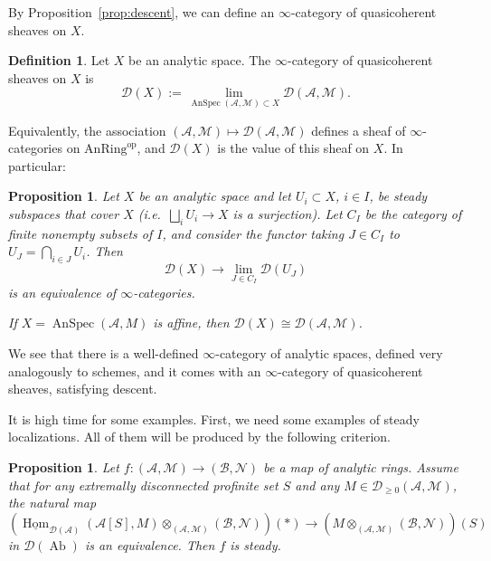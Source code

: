 \documentclass[11pt]{amsbook}
\DeclareMathOperator{\Hom}{Hom}
\newcommand{\intHom}{\underline{\Hom}}
\newcommand{\AnRing}{{\mathrm{AnRing}}}
\DeclareMathOperator{\AnSpec}{AnSpec}
\DeclareMathOperator{\Ab}{Ab}
\numberwithin{equation}{section}
\numberwithin{theorem}{section}
\newtheorem{proposition}[theorem]{Proposition}
\theoremstyle{definition}
\newtheorem{definition}[theorem]{Definition}
\begin{document}
By Proposition~\ref{prop:descent}, we can define an $\infty$-category of quasicoherent sheaves on $X$.

\begin{definition} Let $X$ be an analytic space. The $\infty$-category of quasicoherent sheaves on $X$ is
\[
\mathcal D(X) := \lim_{\AnSpec(\mathcal A,\mathcal M)\subset X} \mathcal D(\mathcal A,\mathcal M).
\]
\end{definition}

Equivalently, the association $(\mathcal A,\mathcal M)\mapsto \mathcal D(\mathcal A,\mathcal M)$ defines a sheaf of $\infty$-categories on $\AnRing^{\mathrm{op}}$, and $\mathcal D(X)$ is the value of this sheaf on $X$. In particular:

\begin{proposition} Let $X$ be an analytic space and let $U_i\subset X$, $i\in I$, be steady subspaces that cover $X$ (i.e.~$\bigsqcup_i U_i\to X$ is a surjection). Let $C_I$ be the category of finite nonempty subsets of $I$, and consider the functor taking $J\in C_I$ to $U_J=\bigcap_{i\in J} U_i$. Then
\[
\mathcal D(X)\to \lim_{J\in C_I} \mathcal D(U_J)
\]
is an equivalence of $\infty$-categories.

If $X=\AnSpec(\mathcal A,M)$ is affine, then $\mathcal D(X)\cong \mathcal D(\mathcal A,\mathcal M)$.
\end{proposition}

We see that there is a well-defined $\infty$-category of analytic spaces, defined very analogously to schemes, and it comes with an $\infty$-category of quasicoherent sheaves, satisfying descent.

It is high time for some examples. First, we need some examples of steady localizations. All of them will be produced by the following criterion.

\begin{proposition}\label{prop:proringatinfinity} Let $f: (\mathcal A,\mathcal M)\to (\mathcal B,\mathcal N)$ be a map of analytic rings. Assume that for any extremally disconnected profinite set $S$ and any $M\in \mathcal D_{\geq 0}(\mathcal A,\mathcal M)$, the natural map
\[
(\intHom_{\mathcal D(\mathcal A)}(\mathcal A[S],M)\otimes_{(\mathcal A,\mathcal M)} (\mathcal B,\mathcal N))(\ast)\to (M\otimes_{(\mathcal A,\mathcal M)} (\mathcal B,\mathcal N))(S)
\]
in $\mathcal D(\Ab)$ is an equivalence. Then $f$ is steady.
\end{proposition}
\end{document}
